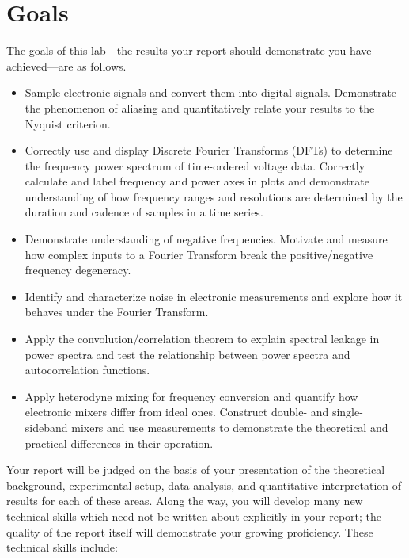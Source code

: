 \documentclass[11pt,preprint]{aastex}
\begin{document}
\section{Goals} \label{goals}

\noindent
The goals of this lab---the results your report should
demonstrate you have achieved---are as follows.

\begin{itemize}

\item Sample electronic signals and convert them into digital signals. Demonstrate
the phenomenon of aliasing and quantitatively relate your results to the Nyquist criterion.

\item Correctly use and display Discrete Fourier Transforms (DFTs) to 
  determine the frequency power spectrum of time-ordered voltage data.
  Correctly calculate and label frequency and power axes in plots and demonstrate
  understanding of how frequency ranges and resolutions are determined by 
  the duration and cadence of samples in a time series.

\item Demonstrate understanding of negative frequencies. Motivate and measure how complex inputs to a Fourier Transform
break the positive/negative frequency degeneracy.


\item Identify and characterize noise in electronic measurements and explore how it behaves 
  under the Fourier Transform.

\item Apply the convolution/correlation theorem to explain
  spectral leakage in power spectra
  and test the relationship between power spectra and autocorrelation functions.

\item Apply heterodyne mixing for frequency conversion
  and quantify how electronic mixers differ from
  ideal ones. Construct double- and single-sideband mixers and use measurements
  to demonstrate the theoretical and practical differences in their operation.

\end{itemize}

\noindent
Your report will be judged on the basis of your presentation of the
theoretical background, experimental setup, data analysis, and
quantitative interpretation of results for each of these areas.
Along the way, you will develop many new technical skills which
need not be written about explicitly in your report; the quality of
the report itself will demonstrate your growing proficiency.
These technical skills include:
\end{document}
